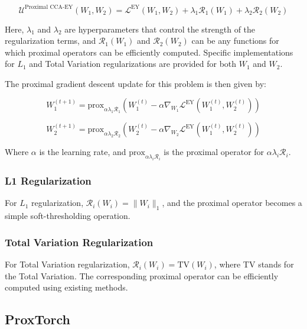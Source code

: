 \begin{equation}
\label{eq:proximal-CCA-EY}
    \mathcal{U}^{\text{Proximal CCA-EY}}(W_1, W_2) = \mathcal{L}^{\text{EY}}(W_1, W_2) + \lambda_1 \mathcal{R}_1(W_1) + \lambda_2 \mathcal{R}_2(W_2)
\end{equation}

Here, \( \lambda_1 \) and \( \lambda_2 \) are hyperparameters that control the strength of the regularization terms, and \( \mathcal{R}_1(W_1) \) and \( \mathcal{R}_2(W_2) \) can be any functions for which proximal operators can be efficiently computed.
Specific implementations for \( L_1 \) and Total Variation regularizations are provided for both \( W_1 \) and \( W_2 \).

The proximal gradient descent update for this problem is then given by:

\begin{equation}
\label{eq:proximal-update}
    W_1^{(t+1)} = \text{prox}_{\alpha \lambda_1 \mathcal{R}_1}\left( W_1^{(t)} - \alpha \nabla_{W_1} \mathcal{L}^{\text{EY}}(W_1^{(t)}, W_2^{(t)}) \right)
\end{equation}

\begin{equation}
\label{eq:proximal-update-W2}
    W_2^{(t+1)} = \text{prox}_{\alpha \lambda_2 \mathcal{R}_2}\left( W_2^{(t)} - \alpha \nabla_{W_2} \mathcal{L}^{\text{EY}}(W_1^{(t)}, W_2^{(t)}) \right)
\end{equation}

Where \( \alpha \) is the learning rate, and \( \text{prox}_{\alpha \lambda_i \mathcal{R}_i} \) is the proximal operator for \( \alpha \lambda_i \mathcal{R}_i \).

\subsubsection{L1 Regularization}
For \( L_1 \) regularization, \( \mathcal{R}_i(W_i) = \| W_i \|_1 \), and the proximal operator becomes a simple soft-thresholding operation.

\subsubsection{Total Variation Regularization}
For Total Variation regularization, \( \mathcal{R}_i(W_i) = \text{TV}(W_i) \), where TV stands for the Total Variation.
The corresponding proximal operator can be efficiently computed using existing methods.

\subsection{ProxTorch}

